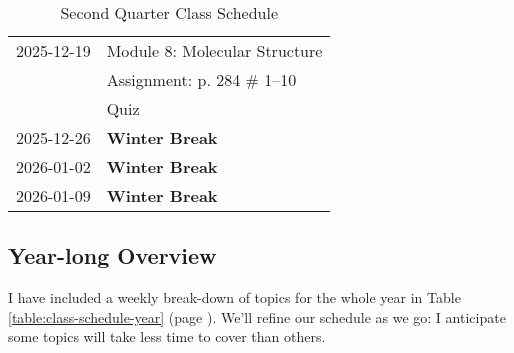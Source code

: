 \documentclass[11pt, oneside]{article}   	%
\begin{document}
\begin{table}[h]
\begin{tabular}{ l | l }
\hline
2025-12-19 & Module 8: Molecular Structure \\
                   & Assignment: p. 284 \# 1--10 \\
                   & Quiz \\

\hline
2025-12-26 & \textbf{Winter Break} \\

\hline
2026-01-02 & \textbf{Winter Break} \\

\hline
2026-01-09 & \textbf{Winter Break} \\

\end{tabular}
\caption{Second Quarter Class Schedule}\label{table:class-schedule-q2}
\end{table}

\subsection*{Year-long Overview}
I have included a weekly break-down of topics for the whole year in Table \ref{table:class-schedule-year} (page \pageref{table:class-schedule-year} ).
We'll refine our schedule as we go: I anticipate some topics will take less time to cover than others.
\end{document}
